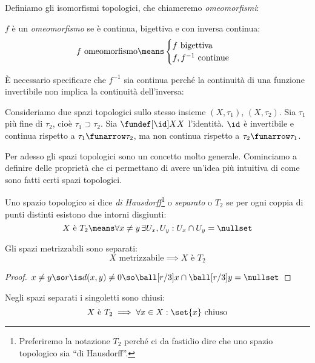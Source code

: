 Definiamo gli isomorfismi topologici, che chiameremo \emph{omeomorfismi}:

\begin{defn}[Omeomorfismo]
	$f$ è un \emph{omeomorfismo} se è continua, bigettiva e con inversa continua:
	\[f\text{ omeomorfismo}\means
	\begin{cases}
		f\text{ bigettiva }\\
		f, f^{-1}\text{ continue}
	\end{cases}\]
\end{defn}

È necessario specificare che $f^{-1}$ sia continua perché la continuità di una funzione invertibile non implica la continuità dell'inversa:

\begin{es}
	Consideriamo due spazi topologici sullo stesso insieme $(X,\tau_1)$, $(X,\tau_2)$.
	Sia $\tau_1$ più fine di $\tau_2$, cioè $\tau_1\supset\tau_2$.
	Sia $\fundef[\id]XX$ l'identità.
	$\id$ è invertibile e continua rispetto a $\tau_1\funarrow\tau_2$,
	ma non continua rispetto a $\tau_2\funarrow\tau_1$.
\end{es}


Per adesso gli spazi topologici sono un concetto molto generale. Cominciamo a definire delle proprietà che ci permettano di avere un'idea più intuitiva di come sono fatti certi spazi topologici.

\begin{defn}
	Uno spazio topologico si dice \emph{di Hausdorff}\footnote{Preferiremo la notazione $T_2$ perché ci da fastidio dire che uno spazio topologico sia ``di Hausdorff''.} o \emph{separato} o \emph{$T_2$} se per ogni coppia di punti distinti esistono due intorni disgiunti:
	\[X\text{ è }T_2\means
	\forall x\neq y\,\exists U_x,U_y:U_x\cap U_y=\nullset\]
\end{defn}

\begin{prop}
	Gli spazi metrizzabili sono separati:
	\[X\text{ metrizzabile}\implies X\text{ è }T_2\]
\end{prop}

\begin{proof}
	$x\neq y\so r\is d(x,y)\neq 0\so\ball[r/3]x\cap\ball[r/3]y=\nullset$
\end{proof}

\begin{prop}
	Negli spazi separati i singoletti sono chiusi:
	\[X\text{ è }T_2\implies\forall x\in X:\set{x}\text{ chiuso}\]
\end{prop}

